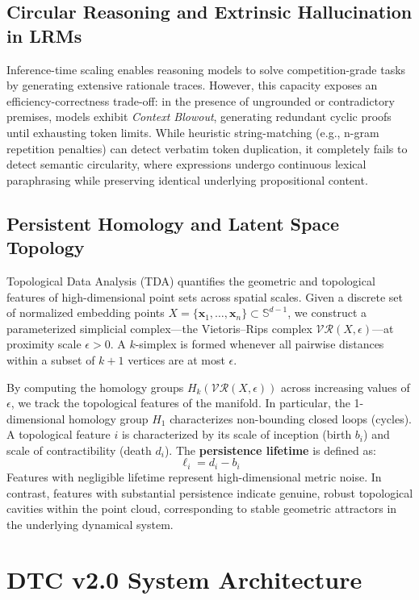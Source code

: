 \documentclass[11pt,a4paper]{article}
\begin{document}
\subsection{Circular Reasoning and Extrinsic Hallucination in LRMs}
Inference-time scaling enables reasoning models to solve competition-grade tasks by generating extensive rationale traces. However, this capacity exposes an efficiency-correctness trade-off: in the presence of ungrounded or contradictory premises, models exhibit \textit{Context Blowout}, generating redundant cyclic proofs until exhausting token limits. While heuristic string-matching (e.g., n-gram repetition penalties) can detect verbatim token duplication, it completely fails to detect semantic circularity, where expressions undergo continuous lexical paraphrasing while preserving identical underlying propositional content.

\subsection{Persistent Homology and Latent Space Topology}
Topological Data Analysis (TDA) quantifies the geometric and topological features of high-dimensional point sets across spatial scales. Given a discrete set of normalized embedding points $X = \{\mathbf{x}_1, \dots, \mathbf{x}_n\} \subset \mathbb{S}^{d-1}$, we construct a parameterized simplicial complex---the Vietoris--Rips complex $\mathcal{VR}(X, \epsilon)$---at proximity scale $\epsilon > 0$. A $k$-simplex is formed whenever all pairwise distances within a subset of $k+1$ vertices are at most $\epsilon$.

By computing the homology groups $H_k(\mathcal{VR}(X, \epsilon))$ across increasing values of $\epsilon$, we track the topological features of the manifold. In particular, the 1-dimensional homology group $H_1$ characterizes non-bounding closed loops (cycles). A topological feature $i$ is characterized by its scale of inception (birth $b_i$) and scale of contractibility (death $d_i$). The \textbf{persistence lifetime} is defined as:
\begin{equation}
\ell_i = d_i - b_i
\end{equation}
Features with negligible lifetime represent high-dimensional metric noise. In contrast, features with substantial persistence indicate genuine, robust topological cavities within the point cloud, corresponding to stable geometric attractors in the underlying dynamical system.

\section{DTC v2.0 System Architecture}
\end{document}
